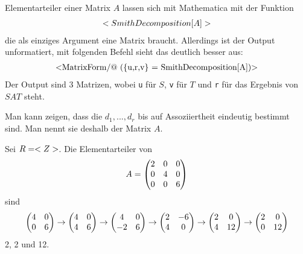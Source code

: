 \begin{mathematica}
	Elementarteiler einer Matrix $A$ lassen sich mit Mathematica mit der Funktion
	\begin{align}
	\texttt{SmithDecomposition[A]}\notag
	\end{align}
	die als einziges Argument eine Matrix braucht. Allerdings ist der Output unformatiert, mit folgenden Befehl sieht das deutlich besser aus:
	\begin{align}
	\text{\texttt{MatrixForm/@ (\{u,r,v\} = SmithDecomposition[A])}}\notag
	\end{align}
	Der Output sind 3 Matrizen, wobei \texttt{u} für $S$, \texttt{v} für $T$ und \texttt{r} für das Ergebnis von $SAT$ steht.
\end{mathematica}

\begin{remark}
	Man kann zeigen, dass die $d_1,...,d_r$ bis auf Assoziiertheit eindeutig bestimmt sind. Man nennt sie deshalb  der Matrix $A$.
\end{remark}

\begin{example}
	Sei $R=\whole$. Die Elementarteiler von
	\begin{align}
		A=\begin{pmatrix}2&0&0 \\ 0&4&0 \\0&0&6\end{pmatrix}\notag
	\end{align}
	sind 
	\begin{align}
		\begin{pmatrix}4&0\\0&6\end{pmatrix}\to\begin{pmatrix}4&0\\4&6\end{pmatrix}\notag
		\to\begin{pmatrix}4&0\\-2&6\end{pmatrix} \to\begin{pmatrix}2&-6\\4&0\end{pmatrix} \notag
		\to\begin{pmatrix}2&0\\4&12\end{pmatrix} \to\begin{pmatrix}2&0\\0&12\end{pmatrix}\notag
	\end{align}
	2, 2 und 12.
\end{example}

